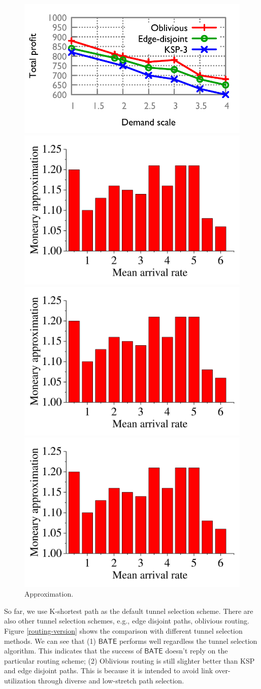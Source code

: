 \documentclass[sigconf]{acmart}
\begin{document}
\begin{figure} 
   \begin{minipage}[t]{0.24\linewidth} 
    \centering 
    \includegraphics[width=1.6 in]{fig/evaluation/routing.pdf}
    \caption{Routings.} 
    \label{routing-version} 
  \end{minipage}%
   \begin{minipage}[t]{0.24\linewidth} 
    \centering 
    \includegraphics[width=1.6 in]{fig/evaluation/approximation.pdf}
    \caption{Approximation.} 
    \label{approximation} 
  \end{minipage}
     \begin{minipage}[t]{0.24\linewidth} 
    \centering 
    \includegraphics[width=1.6 in]{fig/evaluation/approximation.pdf}
    \caption{Approximation.} 
    \label{approximation} 
  \end{minipage}
       \begin{minipage}[t]{0.24\linewidth} 
    \centering 
    \includegraphics[width=1.6 in]{fig/evaluation/approximation.pdf}
    \caption{Approximation.} 
    \label{approximation} 
  \end{minipage}
  
\end{figure}

So far, we use K-shortest path as the default tunnel selection scheme.
There are also other tunnel selection schemes, e.g., edge disjoint paths\cite{Bruno2013Dynamic}, oblivious routing\cite{SMORE}.
Figure \ref{routing-version} shows the comparison with different tunnel selection methods.
We can see that (1) $\mathsf{BATE}$ performs well regardless the tunnel selection algorithm.
This indicates that the success of $\mathsf{BATE}$ doesn't reply on the particular routing scheme;
(2)  Oblivious routing is still slighter better than KSP and edge disjoint paths.
This is because it is intended to avoid link over-utilization through diverse and low-stretch path selection.
\end{document}
